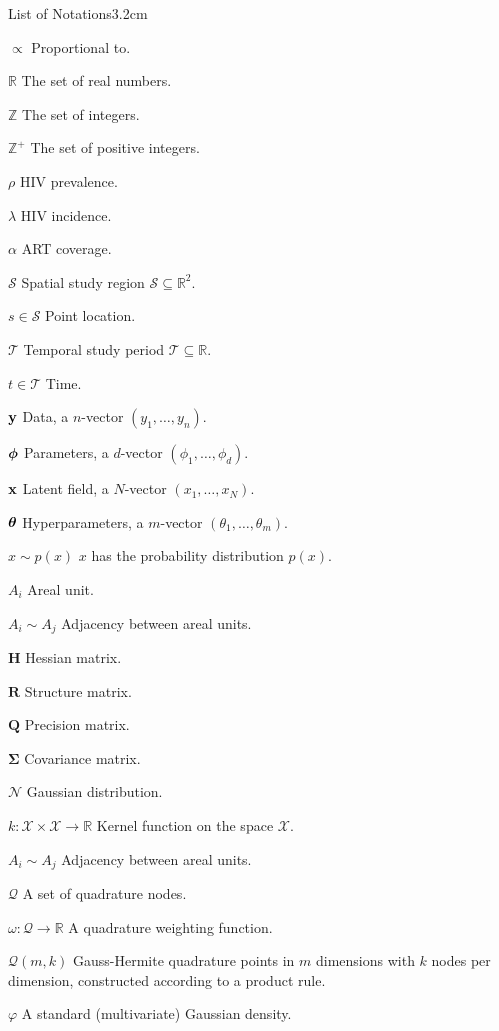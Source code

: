 \begin{mclistof}{List of Notations}{3.2cm}

\item[$\propto$] Proportional to.
\item[$\mathbb{R}$] The set of real numbers.
\item[$\mathbb{Z}$] The set of integers.
\item[$\mathbb{Z}^+$] The set of positive integers.
\item[$\rho$] HIV prevalence.
\item[$\lambda$] HIV incidence.
\item[$\alpha$] ART coverage.
\item[$\mathcal{S}$] Spatial study region $\mathcal{S} \subseteq \mathbb{R}^2$.
\item[$s \in \mathcal{S}$] Point location.
\item[$\mathcal{T}$] Temporal study period $\mathcal{T} \subseteq \mathbb{R}$.
\item[$t \in \mathcal{T}$] Time.
\item[$\boldsymbol{\mathbf{y}}$] Data, a $n$-vector $(y_1, \ldots, y_n)$.
\item[$\boldsymbol{\mathbf{\phi}}$] Parameters, a $d$-vector $(\phi_1, \ldots, \phi_d)$.
\item[$\mathbf{x}$] Latent field, a $N$-vector $(x_1, \ldots, x_N)$.
\item[$\bm{\theta}$] Hyperparameters, a $m$-vector $(\theta_1, \ldots, \theta_m)$.
\item[$x \sim p(x)$] $x$ has the probability distribution $p(x)$.
\item[$A_i$] Areal unit.
\item[$A_i \sim A_j$] Adjacency between areal units.
\item[$\mathbf{H}$] Hessian matrix.
\item[$\mathbf{R}$] Structure matrix.
\item[$\mathbf{Q}$] Precision matrix.
\item[$\bm{\Sigma}$] Covariance matrix.
\item[$\mathcal{N}$] Gaussian distribution.
\item[$k: \mathcal{X} \times \mathcal{X} \to \mathbb{R}$] Kernel function on the space $\mathcal{X}$.
\item[$A_i \sim A_j$] Adjacency between areal units.
\item[$\mathcal{Q}$] A set of quadrature nodes.
\item[$\omega: \mathcal{Q} \to \mathbb{R}$] A quadrature weighting function.
\item[$\mathcal{Q}(m, k)$] Gauss-Hermite quadrature points in $m$ dimensions with $k$ nodes per dimension, constructed according to a product rule.
\item[$\varphi$] A standard (multivariate) Gaussian density.

\end{mclistof} 
